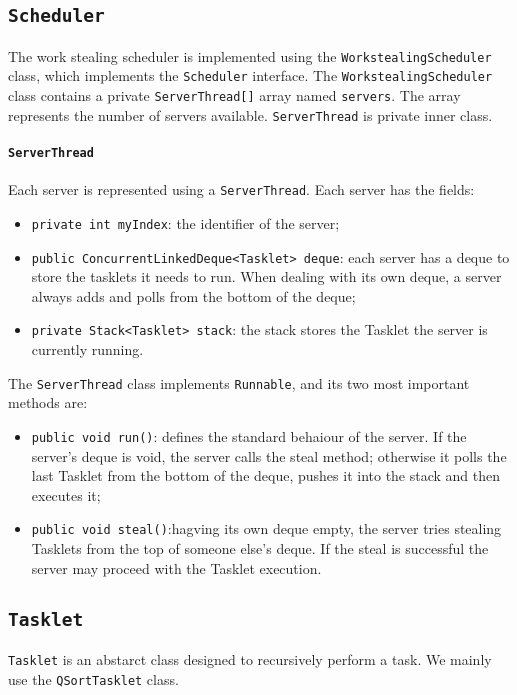 \documentclass[twocolumn]{article}
\def\code#1{\texttt{#1}}
\begin{document}
	\subsection{\code{Scheduler}}
	The work stealing scheduler is implemented using the \code{WorkstealingScheduler} class, which implements the \code{Scheduler} interface.
	The \code{WorkstealingScheduler} class contains a private \code{ServerThread[]} array named \code{servers}. The array represents the number of servers available.
	\code{ServerThread} is private inner class. 
	
	\paragraph {\code{ServerThread}}
	Each server is represented using a \code{ServerThread}. Each server has the fields:
	\begin{itemize}
		\item \code{private int myIndex}: the identifier of the server;
		\item \code{public ConcurrentLinkedDeque<Tasklet> deque}: each server has a deque to store the tasklets it needs to run. When dealing with its own deque, a server always adds and polls from the bottom of the deque;
		\item \code{private Stack<Tasklet> stack}: the stack stores the Tasklet the server is currently running.
	\end{itemize}
	The \code{ServerThread} class implements \code{Runnable}, and its two most important methods are:
	\begin{itemize}
		\item \code{public void run()}: defines the standard behaiour of the server. If the server's deque is void, the server calls the steal method; otherwise it polls the last Tasklet from the bottom of the deque, pushes it into the stack and then executes it;
		\item \code{public void steal()}:hagving its own deque empty, the server tries stealing Tasklets from the top of someone else's deque. If the steal is successful the server may proceed with the Tasklet execution.
	\end{itemize} 
	
	\subsection{\code{Tasklet}}
	\code{Tasklet} is an abstarct class designed to recursively perform a task. We mainly use the \code{QSortTasklet} class.
	
\end{document}
